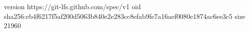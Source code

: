 version https://git-lfs.github.com/spec/v1
oid sha256:eb4f6217f5af200d5063b840e2e283cc8efab9fe7a16aef0080e1874ac6ee3c5
size 21960
